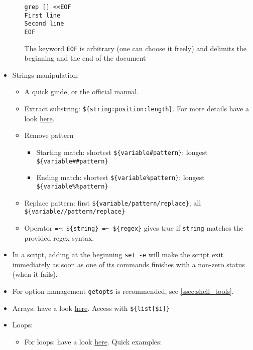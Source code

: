 \documentclass[a4paper,12pt,%
              final%
              ]{article}
\begin{document}
\begin{itemize}
\begin{itemize}
\begin{verbatim}
grep [] <<EOF
First line
Second line
EOF
\end{verbatim}
        The keyword \texttt{EOF} is arbitrary (one can choose it freely) and delimits the beginning and the end of the document
    \end{itemize}
  \item Strings manipulation:
    \begin{itemize}
      \item A quick \href{https://sookocheff.com/post/bash/bash-string-operators/}{guide}, or the official \href{https://www.gnu.org/software/bash/manual/html_node/Shell-Parameter-Expansion.html}{manual}.
      \item Extract substring: \verb|${string:position:length}|. For more details have a look \href{https://stackoverflow.com/questions/1405611/how-to-extract-the-first-two-characters-of-a-string-in-shell-scripting}{here}.
      \item Remove pattern
        \begin{itemize}
          \item Starting match: shortest \verb|${variable#pattern}|; longest \verb|${variable##pattern}|
          \item Ending match: shortest \verb|${variable%pattern}|; longest \verb|${variable%%pattern}|
        \end{itemize}
      \item Replace pattern: first \verb|${variable/pattern/replace}|; all \verb|${variable//pattern/replace}|
      \item Operator \verb|=~|: \verb|${string} =~ ${regex}| gives true if \verb|string| matches the provided regex syntax.
    \end{itemize}
  \item In a script, adding at the beginning \verb|set -e| will make the script exit immediately as soon as one of its commands finishes with a non-zero status (when it fails).
  \item For option management \verb|getopts| is recommended, see \autoref{ssec:shell_tools}.
  \item Arrays: have a look \href{https://opensource.com/article/18/5/you-dont-know-bash-intro-bash-arrays}{here}. Access with \verb|${list[$i]}|
  \item Loops:
    \begin{itemize}
      \item For loops: have a look \href{https://www.cyberciti.biz/faq/bash-for-loop/}{here}. Quick examples:

\end{itemize}
\end{itemize}
\end{document}
